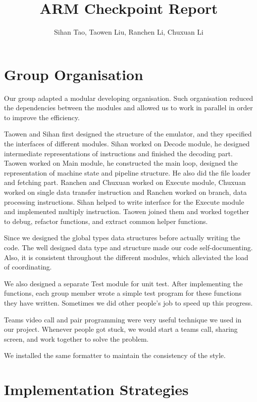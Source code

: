 \documentclass[10pt]{article}
\begin{document}
	\title{ARM Checkpoint Report}
	\author{Sihan Tao, Taowen Liu, Ranchen Li, Chuxuan Li}

	\maketitle

	\section{Group Organisation}

  Our group adapted a modular developing organisation. Such organisation reduced the dependencies between the modules and allowed us to work in parallel in order to improve the efficiency.

  Taowen and Sihan first designed the structure of the emulator, and they specified the interfaces of different modules. Sihan worked on Decode module, he designed intermediate representations of instructions and finished the decoding part. Taowen worked on Main module, he constructed the main loop, designed the representation of machine state and pipeline structure. He also did the file loader and fetching part. Ranchen and Chuxuan worked on Execute module, Chuxuan worked on single data transfer instruction and Ranchen worked on branch, data processing instructions. Sihan helped to write interface for the Execute module and implemented multiply instruction. Taowen joined them and worked together to debug, refactor functions, and extract common helper functions.

  Since we designed the global types data structures before actually writing the code. The well designed data type and structure made our code self-documenting. Also, it is consistent throughout the different modules, which alleviated the load of coordinating.

  We also designed a separate Test module for unit test. After implementing the functions, each group member wrote a simple test program for these functions they have written. Sometimes we did other people's job to speed up this progress.

  Teams video call and pair programming were very useful technique we used in our project. Whenever people got stuck, we would start a teams call, sharing screen, and work together to solve the problem.

  We installed the same formatter to maintain the consistency of the style.

	\section{Implementation Strategies}
\end{document}

